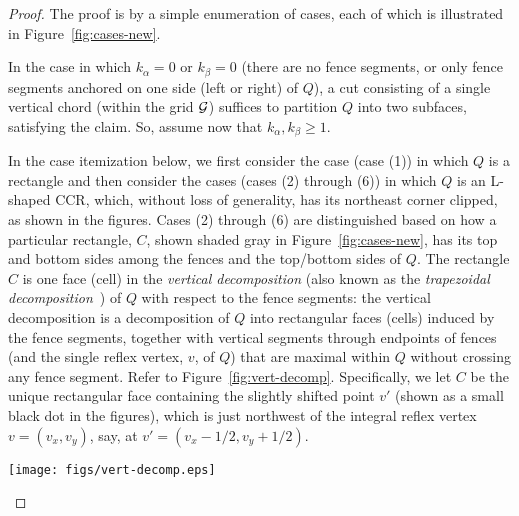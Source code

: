 \documentclass{article}
\begin{document}
\begin{proof}
    The proof is by a simple enumeration of cases, each of which is
    illustrated in Figure~\ref{fig:cases-new}.

In the case in which $k_\alpha=0$ or $k_\beta=0$ (there are no fence
segments, or only fence segments anchored on one side (left or right)
of $Q$), a cut consisting of a single vertical chord (within the grid
${\cal G}$) suffices to partition $Q$ into two subfaces, satisfying
the claim.  So, assume now that $k_\alpha, k_\beta\geq 1$.

In the case itemization below, we first consider the case (case (1)) in which $Q$ is a rectangle and
then consider the cases (cases (2) through (6)) in which $Q$ is an
L-shaped CCR, which, without loss of generality, has its northeast
corner clipped, as shown in the figures.
Cases (2) through (6) are distinguished based on how a particular rectangle, $C$, shown
shaded gray in Figure~\ref{fig:cases-new}, has its top and bottom sides among the fences and the top/bottom sides of $Q$.
The rectangle $C$ is one face (cell) in the {\em vertical decomposition} (also known as the
{\em trapezoidal decomposition}~\cite{BCKO})
of $Q$ with respect to the
fence segments: the vertical decomposition is a decomposition of $Q$ into rectangular faces
(cells) induced by the fence segments, together with vertical segments
through endpoints of fences (and the single reflex vertex, $v$, of $Q$) that
are maximal within $Q$ without crossing any fence segment.
Refer to Figure~\ref{fig:vert-decomp}.
% 
Specifically, we let $C$ be the unique rectangular face containing the slightly shifted point $v'$ (shown as a small black dot in
the figures), which is just northwest of the integral reflex vertex $v=(v_x,v_y)$,
say, at $v'=(v_x-1/2,v_y+1/2)$.

\begin{figure*}[!htbp]
\centering
\texttt{[image: figs/vert-decomp.eps]}
\caption{The vertical decomposition of an L-shaped CCR $Q$ with
  respect to red and blue fence segments. The case shown is a CCR with
  the northeast corner clipped; the unique reflex vertex is $v$, and
  the slightly shifted, to the northwest, point $v'$ is shown as a
  small dot.  The cell $C$ is defined to be the unique (rectangular)
  face containing $v'$. Two examples are shown, both the the top and
  bottom sides of $C$ contained in blue fence segments $\beta^+$
  (anchored on $r^+$) and $\beta^-$ (which we consider to be anchored
  on the top endpoint of $r$, or equivalently the bottom endpoint of
  $r^+$).}
\label{fig:vert-decomp}
\end{figure*}



\end{proof}
\end{document}
